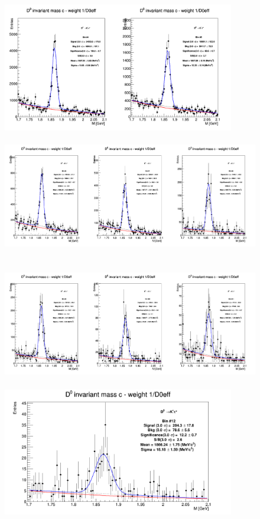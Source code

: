 \begin{figure}[!htp]
\centering

{\includegraphics[width=1\linewidth, height=5.6cm]{figuresVsCent/Dzero/MassPlots/60100/InvMassDistributions_Dzero_Bins4to5.png}}
{\includegraphics[width=1\linewidth, height=5.6cm]{figuresVsCent/Dzero/MassPlots/60100/InvMassDistributions_Dzero_Bins6to8.png}}
{\includegraphics[width=1\linewidth, height=5.6cm]{figuresVsCent/Dzero/MassPlots/60100/InvMassDistributions_Dzero_Bins9to11.png}}
{\includegraphics[width=0.6\linewidth, height=5.6cm]{figuresVsCent/Dzero/MassPlots/60100/InvMassDistributions_Dzero_Bins12to12.png}}


\end{figure}
